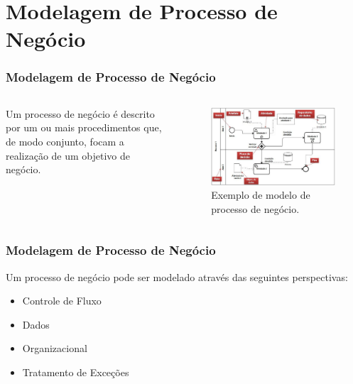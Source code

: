 \documentclass[aspectratio=169]{beamer}
\begin{document}
\section{Modelagem de Processo de Negócio}
\begin{frame}
\frametitle{Modelagem de Processo de Negócio}
\justifying
\begin{columns}

\begin{column}{0.5\textwidth}
Um processo de negócio é descrito por um ou mais procedimentos que, de modo conjunto, focam a realização de um objetivo de negócio.
\end{column}

\begin{column}{0.5\textwidth}
\begin{figure}
\centering
\includegraphics[scale=0.25]{images/diagrama.png}
\caption{Exemplo de modelo de processo de negócio.}
\label{image:exemplo}
\end{figure}
\end{column}
\end{columns}

\end{frame}

\begin{frame}
\frametitle{Modelagem de Processo de Negócio}
\justifying

Um processo de negócio pode ser modelado através das seguintes perspectivas:
\begin{itemize}
\item Controle de Fluxo
\item Dados
\item Organizacional
\item Tratamento de Exceções
\end{itemize}

\end{frame}
\end{document}
